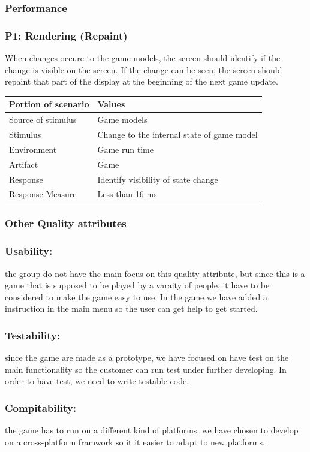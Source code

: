 \subsubsection{Performance}

\subsubsection*{P1: Rendering (Repaint)}
When changes occure to the game models, the screen should identify if the change 
is visible on the screen. If the change can be seen, the screen should repaint 
that part of the display at the beginning of the next game update.

\begin{tabular}{| l | l |}
	\hline
	{\bf Portion of scenario} & {\bf Values} \\ \hline
	Source of stimulus & Game models\\ \hline
	Stimulus & Change to the internal state of game model\\ \hline
	Environment & Game run time \\ \hline
	Artifact &  Game \\ \hline
	Response & Identify visibility of state change\\ \hline
	Response Measure & Less than 16 ms\\ \hline
\end{tabular}

\subsubsection{Other Quality attributes}
\subsubsection*{Usability: } the group do not have the main focus on this quality attribute, 
but since this is a game that is supposed to be played by a varaity of people, it
have to be considered to make the game easy to use. In the game we have added a 
instruction in the main menu so the user can get help to get started.

\subsubsection*{Testability: } since the game are made as a prototype, we have focused on have
test on the main functionality so the customer can run test under further developing.
In order to have test, we need to write testable code.

\subsubsection*{Compitability: } the game has to run on a different kind of platforms. we
have chosen to develop on a cross-platform framwork so it it easier to adapt to 
new platforms.
